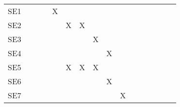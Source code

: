 \documentclass[12pt, titlepage]{article}
\begin{document}
\begin{longtable}{llllllllllllllll}
\multicolumn{1}{l|}{SE1} & \multicolumn{1}{c}{} & \multicolumn{1}{c}{} & \multicolumn{1}{c}{} & \multicolumn{1}{c}{X} & \multicolumn{1}{c}{} & \multicolumn{1}{c}{} & \multicolumn{1}{c}{} & \multicolumn{1}{c}{} & \multicolumn{1}{c}{} & \multicolumn{1}{c}{} & \multicolumn{1}{c}{} & \multicolumn{1}{c}{} & \multicolumn{1}{c}{} & \multicolumn{1}{c}{} & \multicolumn{1}{c}{} \\
\multicolumn{1}{l|}{SE2} & \multicolumn{1}{c}{} & \multicolumn{1}{c}{} & \multicolumn{1}{c}{} & \multicolumn{1}{c}{} & \multicolumn{1}{c}{X} & \multicolumn{1}{c}{X} & \multicolumn{1}{c}{} & \multicolumn{1}{c}{} & \multicolumn{1}{c}{} & \multicolumn{1}{c}{} & \multicolumn{1}{c}{} & \multicolumn{1}{c}{} & \multicolumn{1}{c}{} & \multicolumn{1}{c}{} & \multicolumn{1}{c}{} \\
\multicolumn{1}{l|}{SE3} & \multicolumn{1}{c}{} & \multicolumn{1}{c}{} & \multicolumn{1}{c}{} & \multicolumn{1}{c}{} & \multicolumn{1}{c}{} & \multicolumn{1}{c}{} & \multicolumn{1}{c}{X} & \multicolumn{1}{c}{} & \multicolumn{1}{c}{} & \multicolumn{1}{c}{} & \multicolumn{1}{c}{} & \multicolumn{1}{c}{} & \multicolumn{1}{c}{} & \multicolumn{1}{c}{} & \multicolumn{1}{c}{} \\
\multicolumn{1}{l|}{SE4} & \multicolumn{1}{c}{} & \multicolumn{1}{c}{} & \multicolumn{1}{c}{} & \multicolumn{1}{c}{} & \multicolumn{1}{c}{} & \multicolumn{1}{c}{} & \multicolumn{1}{c}{} & \multicolumn{1}{c}{X} & \multicolumn{1}{c}{} & \multicolumn{1}{c}{} & \multicolumn{1}{c}{} & \multicolumn{1}{c}{} & \multicolumn{1}{c}{} & \multicolumn{1}{c}{} & \multicolumn{1}{c}{} \\
\multicolumn{1}{l|}{SE5} & \multicolumn{1}{c}{} & \multicolumn{1}{c}{} & \multicolumn{1}{c}{} & \multicolumn{1}{c}{} & \multicolumn{1}{c}{X} & \multicolumn{1}{c}{X} & \multicolumn{1}{c}{X} & \multicolumn{1}{c}{} & \multicolumn{1}{c}{} & \multicolumn{1}{c}{} & \multicolumn{1}{c}{} & \multicolumn{1}{c}{} & \multicolumn{1}{c}{} & \multicolumn{1}{c}{} & \multicolumn{1}{c}{} \\
\multicolumn{1}{l|}{SE6} &  &  &  &  &  &  &  & \multicolumn{1}{c}{X} & \multicolumn{1}{c}{} & \multicolumn{1}{c}{} & \multicolumn{1}{c}{} & \multicolumn{1}{c}{} & \multicolumn{1}{c}{} & \multicolumn{1}{c}{} & \multicolumn{1}{c}{} \\
\multicolumn{1}{l|}{SE7} &  &  &  &  &  &  &  &  & \multicolumn{1}{c}{X} & \multicolumn{1}{c}{} & \multicolumn{1}{c}{} & \multicolumn{1}{c}{} & \multicolumn{1}{c}{} & \multicolumn{1}{c}{} & \multicolumn{1}{c}{} \\

\end{longtable}
\end{document}
